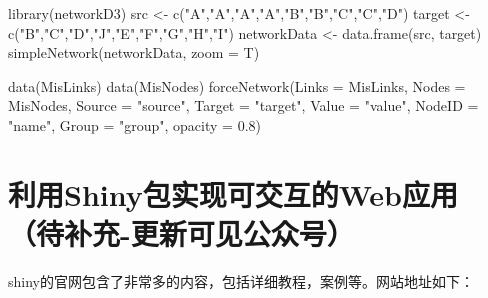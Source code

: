 \documentclass[
]{book}
\newenvironment{Shaded}{\begin{snugshade}}{\end{snugshade}}
\newcommand{\AttributeTok}[1]{\textcolor[rgb]{0.77,0.63,0.00}{#1}}
\newcommand{\FloatTok}[1]{\textcolor[rgb]{0.00,0.00,0.81}{#1}}
\newcommand{\FunctionTok}[1]{\textcolor[rgb]{0.00,0.00,0.00}{#1}}
\newcommand{\NormalTok}[1]{#1}
\newcommand{\OtherTok}[1]{\textcolor[rgb]{0.56,0.35,0.01}{#1}}
\newcommand{\StringTok}[1]{\textcolor[rgb]{0.31,0.60,0.02}{#1}}
\begin{document}
\begin{Shaded}
\begin{Highlighting}[]
\FunctionTok{library}\NormalTok{(networkD3)}
\NormalTok{src }\OtherTok{\textless{}{-}} \FunctionTok{c}\NormalTok{(}\StringTok{"A"}\NormalTok{,}\StringTok{"A"}\NormalTok{,}\StringTok{"A"}\NormalTok{,}\StringTok{"A"}\NormalTok{,}\StringTok{"B"}\NormalTok{,}\StringTok{"B"}\NormalTok{,}\StringTok{"C"}\NormalTok{,}\StringTok{"C"}\NormalTok{,}\StringTok{"D"}\NormalTok{)}
\NormalTok{target }\OtherTok{\textless{}{-}} \FunctionTok{c}\NormalTok{(}\StringTok{"B"}\NormalTok{,}\StringTok{"C"}\NormalTok{,}\StringTok{"D"}\NormalTok{,}\StringTok{"J"}\NormalTok{,}\StringTok{"E"}\NormalTok{,}\StringTok{"F"}\NormalTok{,}\StringTok{"G"}\NormalTok{,}\StringTok{"H"}\NormalTok{,}\StringTok{"I"}\NormalTok{)}
\NormalTok{networkData }\OtherTok{\textless{}{-}} \FunctionTok{data.frame}\NormalTok{(src, target)}
\FunctionTok{simpleNetwork}\NormalTok{(networkData, }\AttributeTok{zoom =}\NormalTok{ T)}
\end{Highlighting}
\end{Shaded}

\begin{Shaded}
\begin{Highlighting}[]
\FunctionTok{data}\NormalTok{(MisLinks)}
\FunctionTok{data}\NormalTok{(MisNodes)}
\FunctionTok{forceNetwork}\NormalTok{(}\AttributeTok{Links =}\NormalTok{ MisLinks, }\AttributeTok{Nodes =}\NormalTok{ MisNodes, }\AttributeTok{Source =} \StringTok{"source"}\NormalTok{,}
             \AttributeTok{Target =} \StringTok{"target"}\NormalTok{, }\AttributeTok{Value =} \StringTok{"value"}\NormalTok{, }\AttributeTok{NodeID =} \StringTok{"name"}\NormalTok{,}
             \AttributeTok{Group =} \StringTok{"group"}\NormalTok{, }\AttributeTok{opacity =} \FloatTok{0.8}\NormalTok{)}
\end{Highlighting}
\end{Shaded}

\hypertarget{ux5229ux7528shinyux5305ux5b9eux73b0ux53efux4ea4ux4e92ux7684webux5e94ux7528ux5f85ux8865ux5145-ux66f4ux65b0ux53efux89c1ux516cux4f17ux53f7}{%
\section{利用Shiny包实现可交互的Web应用（待补充-更新可见公众号）}\label{ux5229ux7528shinyux5305ux5b9eux73b0ux53efux4ea4ux4e92ux7684webux5e94ux7528ux5f85ux8865ux5145-ux66f4ux65b0ux53efux89c1ux516cux4f17ux53f7}}

shiny的官网包含了非常多的内容，包括详细教程，案例等。网站地址如下：
\end{document}
